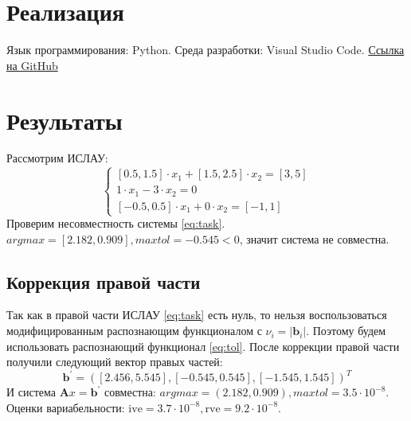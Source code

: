 \documentclass[a4paper,12pt]{article}
\begin{document}
    \section{Реализация}
    Язык программирования: Python. Среда разработки: Visual Studio Code.
    \href{https://github.com/kirillkuks/IntervalAnalysis/tree/master/Lab3}{Ссылка на GitHub}

    \section{Результаты}
    Рассмотрим ИСЛАУ:
    \begin{equation}
        \begin{cases}
            [0.5, 1.5] \cdot x_{1} + [1.5, 2.5] \cdot x_{2} = [3, 5] \\
            1 \cdot x_{1} - 3 \cdot x_{2} = 0 \\
            [-0.5, 0.5] \cdot x_{1} + 0 \cdot x_{2} = [-1, 1]
        \end{cases}
        \label{eq:task}
    \end{equation}
    \noindent
    Проверим несовместность системы \ref{eq:task}. $ argmax = [2.182, 0.909], maxtol = -0.545 < 0 $, значит система не совместна.
    
    \subsection{Коррекция правой части}
    Так как в правой части ИСЛАУ \ref{eq:task} есть нуль, то нельзя воспользоваться модифицированным распознающим функционалом с $ \nu_{i} = | \textbf{b}_{i} | $.
    Поэтому будем использовать распознающий функционал \ref{eq:tol}. \newline
    После коррекции правой части получили следующий вектор правых частей:
    \begin{equation}
        \textbf{b}^{'} = ([2.456, 5.545], [-0.545, 0.545], [-1.545, 1.545])^{T}
        \label{eq:newb}
    \end{equation}
    И система $ \textbf{A}x = \textbf{b}^{'} $ совместна: $ argmax = (2.182, 0.909), maxtol = 3.5 \cdot 10^{-8} $. \newline
    Оценки вариабельности: \newline
    $ \text{ive} = 3.7 \cdot 10^{-8}, \text{rve} = 9.2 \cdot 10^{-8} $.
\end{document}
